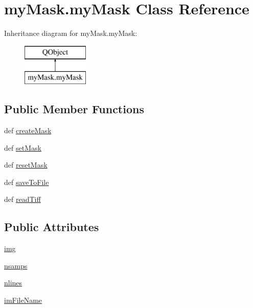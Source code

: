 \hypertarget{classmy_mask_1_1my_mask}{\section{my\-Mask.\-my\-Mask Class Reference}
\label{classmy_mask_1_1my_mask}
}
Inheritance diagram for my\-Mask.\-my\-Mask\-:\begin{figure}[H]
\begin{center}
\leavevmode
\includegraphics[height=2.000000cm]{classmy_mask_1_1my_mask}
\end{center}
\end{figure}
\subsection*{Public Member Functions}
\begin{DoxyCompactItemize}
\item 
def \hyperlink{classmy_mask_1_1my_mask_a551d04051af413888f60e9cf74a964fa}{create\-Mask}
\item 
def \hyperlink{classmy_mask_1_1my_mask_a0b6e02944d05baf74d75976672b75ba3}{set\-Mask}
\item 
def \hyperlink{classmy_mask_1_1my_mask_aaa9e1d93e4202095b0c5ffba2d98d53a}{reset\-Mask}
\item 
def \hyperlink{classmy_mask_1_1my_mask_a1b17be401eb92b7293e40de411f8b17f}{save\-To\-File}
\item 
def \hyperlink{classmy_mask_1_1my_mask_aface6241850e7cbc5bc4ae847e936eac}{read\-Tiff}
\end{DoxyCompactItemize}
\subsection*{Public Attributes}
\begin{DoxyCompactItemize}
\item 
\hyperlink{classmy_mask_1_1my_mask_abc71579b1017e1a3d98fdca371e771fd}{img}
\item 
\hyperlink{classmy_mask_1_1my_mask_aec05f7b9af1f9ba5b283f1034f229cdc}{nsamps}
\item 
\hyperlink{classmy_mask_1_1my_mask_a580ea0a4ec202bbc76ac0ad31b3d9f2b}{nlines}
\item 
\hyperlink{classmy_mask_1_1my_mask_a70decb30e8747e2688e1840f253f3950}{im\-File\-Name}
\end{DoxyCompactItemize}
